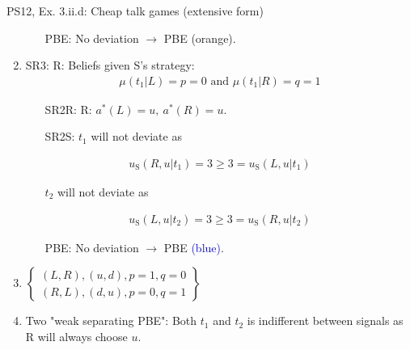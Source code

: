 \begin{frame}{PS12, Ex. 3.ii.d: Cheap talk games (extensive form)}
\begin{multicols}{2}
\begin{enumerate}
        \begin{itemize}\normalsize
          \item[PBE:] No deviation $\rightarrow$ PBE \textcolor{YellowOrange}{(orange)}.
        \end{itemize}\vspace{-5pt}
        \item SR3: R: Beliefs given S's strategy:\vspace{-8pt}
        \begin{align*}
          \mu(t_1|L)=p=0\text{ and }\mu(t_1|R)=q=1
        \end{align*}\vspace{-18pt}
        \begin{itemize}\normalsize
          \item[SR2R:] R: $a^*(L)=u,\ a^*(R)=u$.
          \item[SR2S:] $t_1$ will not deviate as
        \end{itemize}\vspace{-10pt}
        \begin{align*}
          u_\text{S}(R,u|t_1)=3\geq 3=u_\text{S}(L,u|t_1)
        \end{align*}\vspace{-18pt}
        \begin{itemize}\normalsize
          \item[] $t_2$ will not deviate as
        \end{itemize}\vspace{-10pt}
        \begin{align*}
          u_\text{S}(L,u|t_2)=3\geq3=u_\text{S}(R,u|t_2)
        \end{align*}\vspace{-18pt}
        \begin{itemize}\normalsize
          \item[PBE:] No deviation $\rightarrow$ PBE \textcolor{blue}{(blue)}.
        \end{itemize}\vspace{-4pt}
        \item $\left\{\begin{array}{c}
            (L,R),(u,d),p=1,q=0\\
            (R,L),(d,u),p=0,q=1\end{array}\right\}$
        \item \vspace{-1pt}Two "weak separating PBE": Both $t_1$ and $t_2$ is indifferent between signals as R will always choose $u$.
      \end{enumerate}
      \vfill\null
    \end{multicols}
\end{frame}
